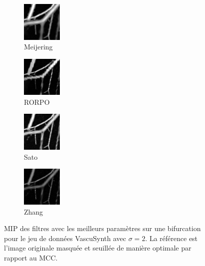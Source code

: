 \begin{figure}[H]
    \begin{subfigure}[t]{0.25\textwidth}
      \includegraphics[clip = true,trim  =  170 230 150 240, width=19.0mm]{Images/Vascu_2_k_Meijering.png}
      \caption{Meijering}
    \end{subfigure}
    \begin{subfigure}[t]{0.25\textwidth}
      \includegraphics[clip = true, trim  =  170 230 150 240, width=19.0mm]{Images/Vascu_2_k_RORPO.png}
      \caption{RORPO}
    \end{subfigure}
    \begin{subfigure}[t]{0.25\textwidth}
      \includegraphics[clip = true, trim  =  170 230 150 240, width=19.0mm]{Images/Vascu_2_k_Sato.png}
      \caption{Sato}
    \end{subfigure}
    \begin{subfigure}[t]{0.25\textwidth}
      \includegraphics[clip = true, trim  =  170 230 150 240, width=19.0mm]{Images/Vascu_2_k_Zhang.png}
      \caption{Zhang}
    \end{subfigure}

        \caption{MIP des filtres avec les meilleurs paramètres sur une bifurcation pour le jeu de données VascuSynth avec $\sigma=2$. La référence est l'image originale masquée et seuillée de manière optimale par rapport au MCC.
        }
      \label{fig:bifurcation_vascu}
  \end{figure}


